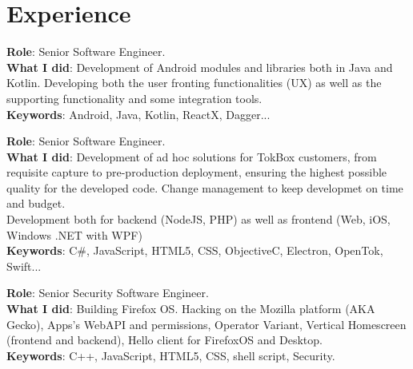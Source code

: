 \documentclass[]{resume}
\begin{document}
\lastupdated


\begin{minipage}[t]{0.66\textwidth}


\section{Experience}
\textbf{Role}: Senior Software Engineer.\\
\textbf{What I did}: Development of Android modules and libraries both in Java and Kotlin. Developing both the user fronting functionalities (UX) as well as the supporting functionality and some integration tools.\\
\textbf{Keywords}: Android, Java, Kotlin, ReactX, Dagger...
\sectionsep

\textbf{Role}: Senior Software Engineer.\\
\textbf{What I did}: Development of ad hoc solutions for TokBox customers, from requisite capture to pre-production deployment, ensuring the highest possible quality for the developed code. Change management to keep developmet on time and budget.\\
Development both for backend (NodeJS, PHP) as well as frontend (Web, iOS, Windows .NET with WPF)\\
\textbf{Keywords}: C\#, JavaScript, HTML5, CSS, ObjectiveC, Electron, OpenTok, Swift...
\sectionsep

\textbf{Role}: Senior Security Software Engineer.\\
\textbf{What I did}: Building Firefox OS. Hacking on the Mozilla platform (AKA Gecko), Apps's WebAPI and permissions, Operator Variant, Vertical Homescreen (frontend and backend), Hello client for FirefoxOS and Desktop.\\
\textbf{Keywords}: C++, JavaScript, HTML5, CSS, shell script, Security.
\sectionsep


\end{minipage}
\end{document}
